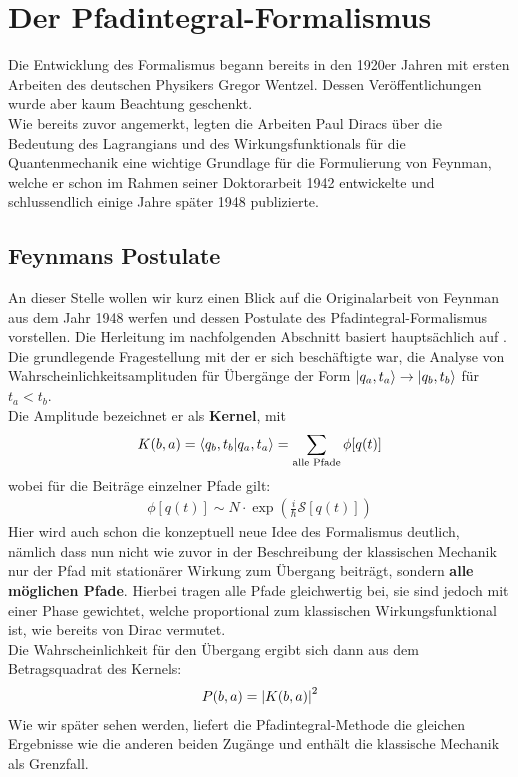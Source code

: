 \section{Der Pfadintegral-Formalismus}
Die Entwicklung des Formalismus begann bereits in den 1920er Jahren mit ersten Arbeiten des deutschen Physikers Gregor Wentzel. Dessen Veröffentlichungen wurde aber kaum Beachtung geschenkt. \\
Wie bereits zuvor angemerkt, legten die Arbeiten Paul Diracs über die Bedeutung des Lagrangians und des Wirkungsfunktionals für die Quantenmechanik eine wichtige Grundlage für die Formulierung von Feynman, welche er schon im Rahmen seiner Doktorarbeit 1942 entwickelte und schlussendlich einige Jahre später 1948 publizierte. 

\subsection{Feynmans Postulate}
An dieser Stelle wollen wir kurz einen Blick auf die Originalarbeit \cite{Feynman1948} von Feynman aus dem Jahr 1948 werfen und dessen Postulate des Pfadintegral-Formalismus vorstellen. Die Herleitung im nachfolgenden Abschnitt basiert hauptsächlich auf \cite{WeigandQFT2014}. \\
Die grundlegende Fragestellung mit der er sich beschäftigte war, die Analyse von Wahrscheinlichkeitsamplituden für Übergänge der Form $\ket{q_a,t_a}\rightarrow\ket{q_b,t_b}$ für $t_a<t_b$. \\
Die Amplitude bezeichnet er als \textbf{Kernel}, mit
\begin{align}
		K(b,a) = \braket{q_b,t_b}{q_a,t_a} 
			   = \sum_{\text{alle Pfade}}\phi[q(t)]
\end{align}
wobei für die Beiträge einzelner Pfade gilt:
\begin{align}
		\phi[q(t)] \sim N \cdot \exp\left(\frac{i}{\hbar}\mathcal{S}[q(t)]\right) 
\end{align} 	
Hier wird auch schon die konzeptuell neue Idee des Formalismus deutlich, nämlich dass nun nicht wie zuvor in der Beschreibung der klassischen Mechanik nur der Pfad mit stationärer Wirkung zum Übergang beiträgt, sondern \textbf{alle möglichen Pfade}. Hierbei tragen alle Pfade gleichwertig bei, sie sind jedoch  mit einer Phase gewichtet, welche proportional zum klassischen Wirkungsfunktional ist, wie bereits von Dirac vermutet. \\
Die Wahrscheinlichkeit für den Übergang ergibt sich dann aus dem Betragsquadrat des Kernels:
\begin{align}
	 P(b,a) = \abs{K(b,a)}^2 
\end{align}
Wie wir später sehen werden, liefert die Pfadintegral-Methode die gleichen Ergebnisse wie die anderen beiden Zugänge und enthält die klassische Mechanik als Grenzfall.

